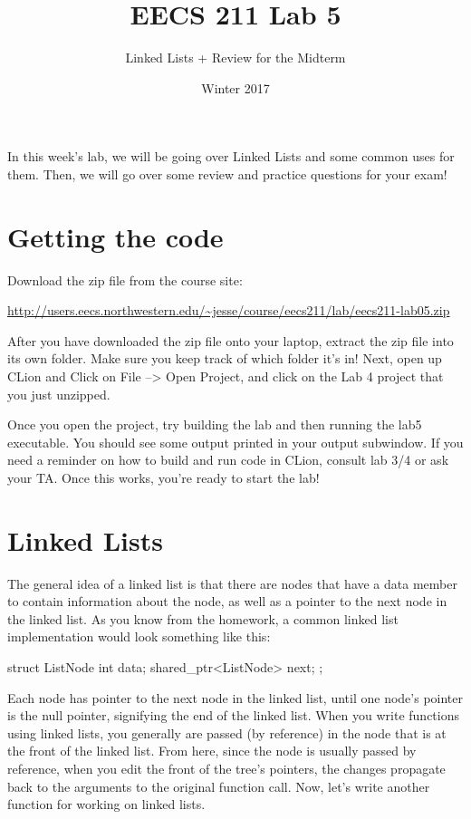 \documentclass{tufte-handout}
\title{EECS 211 Lab 5}
\author{Linked Lists + Review for the Midterm}
\date{Winter 2017}
\begin{document}
\maketitle

In this week's lab, we will be going over Linked Lists and some common uses for them.  Then, we will go over some review and practice questions for your exam!
\section{Getting the code}
Download the zip file from the course site: \medskip

\url{http://users.eecs.northwestern.edu/~jesse/course/eecs211/lab/eecs211-lab05.zip}

\medskip \noindent
After you have downloaded the zip file onto your laptop, extract the zip file into its own folder. Make sure you keep track of which folder it's in!  Next, open up CLion and Click on File --> Open Project, and click on the Lab 4 project that you just unzipped. 

Once you open the project, try building the lab and then running the lab5 executable. 
You should see some output printed in your output subwindow.
If you need a reminder on how to build and run code in CLion, consult lab 3/4 or ask your TA.
Once this works, you're ready to start the lab!


\section{Linked Lists}
The general idea of a linked list is that there are nodes that have a data member to contain information about the node, as well as a pointer to the next node in the linked list.  
As you know from the homework, a common linked list implementation would look something like this:

\begin{Code}
struct ListNode{
    int data;
    shared_ptr<ListNode> next;
    };
\end{Code}

Each node has pointer to the next node in the linked list, until one node's pointer is the null pointer, signifying the end of the linked list.
When you write functions using linked lists, you generally are passed (by reference) in the node that is at the front of the linked list.
From here, since the node is usually passed by reference, when you edit the front of the tree's pointers, the changes propagate back to the arguments to the original function call.
Now, let's write another function for working on linked lists.
\end{document}
